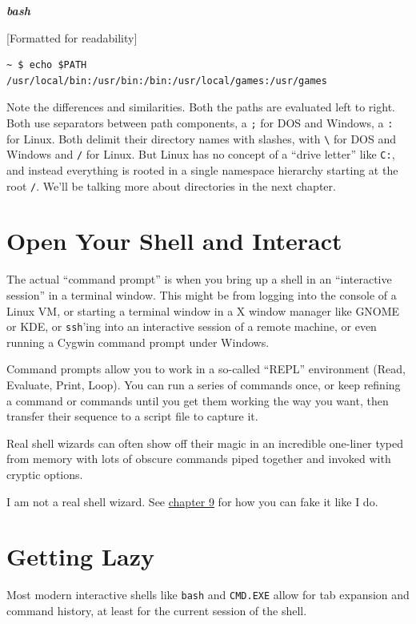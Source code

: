 \documentclass[10pt,]{book}
\numberwithin{figure}{chapter}
\begin{document}
\textbf{\emph{bash}}

{[}Formatted for readability{]}

\begin{verbatim}
~ $ echo $PATH
/usr/local/bin:/usr/bin:/bin:/usr/local/games:/usr/games
\end{verbatim}

Note the differences and similarities. Both the paths are evaluated left
to right. Both use separators between path components, a \texttt{;} for
DOS and Windows, a \texttt{:} for Linux. Both delimit their directory
names with slashes, with \texttt{\textbackslash{}} for DOS and Windows
and \texttt{/} for Linux. But Linux has no concept of a ``drive letter''
like \texttt{C:}, and instead everything is rooted in a single namespace
hierarchy starting at the root \texttt{/}. We'll be talking more about
directories in the next chapter.

\section{Open Your Shell and
Interact}\label{open-your-shell-and-interact}

The actual ``command prompt'' is when you bring up a shell in an
``interactive session'' in a terminal window. This might be from logging
into the console of a Linux VM, or starting a terminal window in a X
window manager like GNOME or KDE, or \texttt{ssh}'ing into an
interactive session of a remote machine, or even running a Cygwin
command prompt under Windows.

Command prompts allow you to work in a so-called ``REPL'' environment
(Read, Evaluate, Print, Loop). You can run a series of commands once, or
keep refining a command or commands until you get them working the way
you want, then transfer their sequence to a script file to capture it.

Real shell wizards can often show off their magic in an incredible
one-liner typed from memory with lots of obscure commands piped together
and invoked with cryptic options.

I am not a real shell wizard. See
\hyperref[HowDoYouKnowWhatYouDontKnow]{chapter 9} for how you can fake
it like I do.

\section{Getting Lazy}\label{getting-lazy}

Most modern interactive shells like \texttt{bash} and \texttt{CMD.EXE}
allow for tab expansion and command history, at least for the current
session of the shell.
\end{document}
